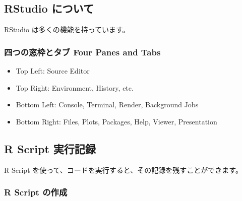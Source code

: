 \documentclass[
]{bxjsbook}
\providecommand{\tightlist}{%
  \setlength{\itemsep}{0pt}\setlength{\parskip}{0pt}}
\theoremstyle{definition}
\theoremstyle{definition}
\theoremstyle{definition}
\theoremstyle{definition}
\theoremstyle{remark}
\begin{document}
\hypertarget{rstudio-ux306bux3064ux3044ux3066}{%
\subsection{RStudio について}\label{rstudio-ux306bux3064ux3044ux3066}}

RStudio は多くの機能を持っています。

\hypertarget{ux56dbux3064ux306eux7a93ux67a0ux3068ux30bfux30d6-four-panes-and-tabs}{%
\subsubsection{四つの窓枠とタブ Four Panes and Tabs}\label{ux56dbux3064ux306eux7a93ux67a0ux3068ux30bfux30d6-four-panes-and-tabs}}

\begin{itemize}
\tightlist
\item
  Top Left: Source Editor
\item
  Top Right: Environment, History, etc.
\item
  Bottom Left: Console, Terminal, Render, Background Jobs
\item
  Bottom Right: Files, Plots, Packages, Help, Viewer, Presentation
\end{itemize}

\hypertarget{r-script-ux5b9fux884cux8a18ux9332}{%
\subsection{R Script 実行記録}\label{r-script-ux5b9fux884cux8a18ux9332}}

R Script を使って、コードを実行すると、その記録を残すことができます。

\hypertarget{r-script-ux306eux4f5cux6210}{%
\subsubsection{R Script の作成}\label{r-script-ux306eux4f5cux6210}}
\end{document}
